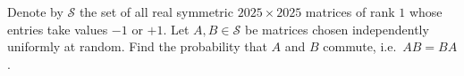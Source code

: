 Denote by \(\mathcal{S}\) the set of all real symmetric \(2025 \times 2025\) matrices of rank \(1\) whose entries take values \(-1\) or \(+1\). Let \(A, B \in \mathcal{S}\) be matrices chosen independently uniformly at random. Find the probability that \(A\) and \(B\) commute, i.e.\ \(AB = BA\).
